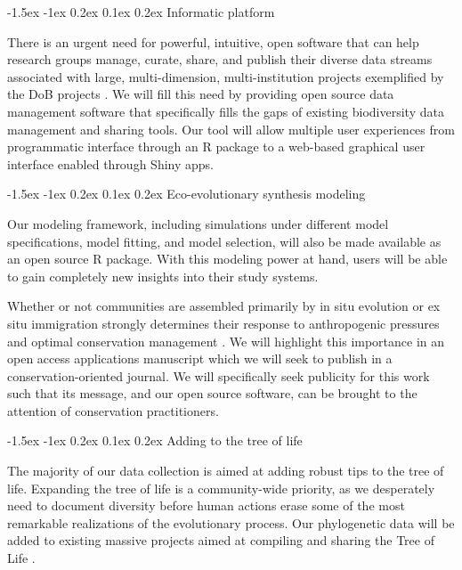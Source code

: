 \documentclass[11pt]{article}
\makeatletter
\renewcommand\subsection{\@startsection{subsection}{1}{\z@}%
                                  {-1.5ex \@plus -1ex \@minus 0.2ex}%
                                  {0.1ex \@plus 0.2ex}%
                                  {\normalfont\large\bfseries}}
\renewcommand\subsubsection{\@startsection{subsection}{1}{\z@}%
                                  {-1.5ex \@plus -1ex \@minus 0.2ex}%
                                  {0.1ex \@plus 0.2ex}%
                                  {\normalfont\bfseries}}
\makeatother
\begin{document}
\subsubsection{Informatic platform}\label{informatic-platform}

There is an urgent need for powerful, intuitive, open software that can
help research groups manage, curate, share, and publish their diverse
data streams associated with large, multi-dimension, multi-institution
projects exemplified by the DoB projects . We will fill this need by
providing open source data management software that specifically fills
the gaps of existing biodiversity data management and sharing tools. Our
tool will allow multiple user experiences from programmatic interface
through an R package to a web-based graphical user interface enabled
through Shiny apps.

\subsubsection{Eco-evolutionary synthesis
modeling}\label{eco-evolutionary-synthesis-modeling}

Our modeling framework, including simulations under different model
specifications, model fitting, and model selection, will also be made
available as an open source R package. With this modeling power at hand,
users will be able to gain completely new insights into their study
systems.

Whether or not communities are assembled primarily by in situ evolution
or ex situ immigration strongly determines their response to
anthropogenic pressures \cite{Karp2012-is} and optimal conservation
management \cite{Barnosky2001-zy}. We will highlight this importance in
an open access applications manuscript which we will seek to publish in
a conservation-oriented journal. We will specifically seek publicity for
this work such that its message, and our open source software, can be
brought to the attention of conservation practitioners.

\subsection{Adding to the tree of life} \label{adding-to-the-tree-of-life}

The majority of our data collection is aimed at adding robust tips to
the tree of life. Expanding the tree of life is a community-wide
priority, as we desperately need to document diversity before human
actions erase some of the most remarkable realizations of the
evolutionary process. Our phylogenetic data will be added to existing
massive projects aimed at compiling and sharing the Tree of Life
\cite{Hinchliff2015-vi}.
\end{document}
